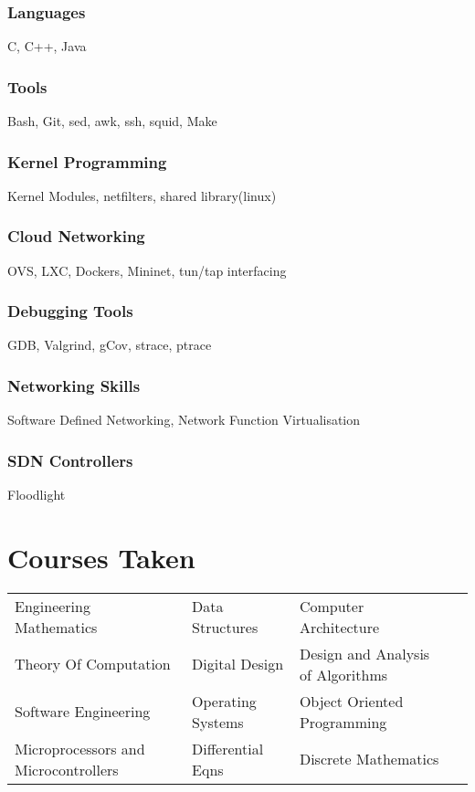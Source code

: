 \documentclass{article}
\begin{document}
\subsubsection{Languages}

C, C++, Java

\subsubsection{Tools}

Bash, Git, sed, awk, ssh, squid, Make

\subsubsection{Kernel Programming}

Kernel Modules, netfilters, shared library(linux)

\subsubsection{Cloud Networking}

OVS, LXC, Dockers, Mininet, tun/tap interfacing

\subsubsection{Debugging Tools}

GDB, Valgrind, gCov, strace, ptrace

\subsubsection{Networking Skills}

Software Defined Networking, Network Function Virtualisation

\subsubsection{SDN Controllers}

Floodlight

\section{Courses Taken}

\begin{tabular}[h]{l l l l}
	Engineering Mathematics & Data Structures & Computer Architecture \\
	Theory Of Computation & Digital Design & Design and Analysis of Algorithms\\
	Software Engineering & Operating Systems & Object Oriented Programming \\
	Microprocessors and Microcontrollers & Differential Eqns & Discrete Mathematics\\
\end{tabular}
\end{document}
